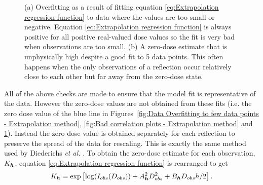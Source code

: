 \begin{figure}
\begin{subfigure}[b]{1\textwidth}
        \end{subfigure}
        \caption{(a) Overfitting as a result of fitting equation \ref{eq:Extrapolation regression function} to data where the values are too small or negative.
        Equation \ref{eq:Extrapolation regression function} is always positive for all positive real-valued dose values so the fit is very bad when observations are too small.
        (b) A zero-dose estimate that is unphysically high despite a good fit to 5 data points.
        This often happens when the only observations of a reflection occur relatively close to each other but far away from the zero-dose state.}
        \label{fig:Bad Extrapolations, violated checks - Extrapolation method}
\end{figure}

All of the above checks are made to ensure that the model fit is representative of the data.
However the zero-dose values are not obtained from these fits (i.e. the zero dose value of the blue line in Figures~\ref{fig:Data Overfitting to few data points - Extrapolation method}, \ref{fig:Bad correlation plots - Extrapolation method} and \ref{fig:Bad Extrapolations, violated checks - Extrapolation method}).
Instead the zero dose value is obtained separately for each reflection to preserve the spread of the data for rescaling.
This is exactly the same method used by Diederichs \textit{et al.} \cite{diederichs2003}.
To obtain the zero-dose estimate for each observation, $K_{\boldsymbol{h}}$, equation \ref{eq:Extrapolation regression function} is rearranged to get
\begin{equation}
    K_{\boldsymbol{h}} = \exp\left[\log(I_{obs}(D_{obs})) + A^2_{\boldsymbol{h}}D^2_{obs} + B_{\boldsymbol{h}} D_{obs} h/2\right].
    \label{eq:Zero-dose extrapolated intensity for each reflection observation}
\end{equation}

